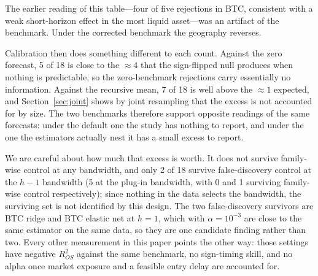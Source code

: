 \documentclass{article}
\theoremstyle{plain}
\theoremstyle{definition}
\newcommand{\rsq}{R^2_{OS}}
\begin{document}
The earlier reading of this table---four of five rejections in BTC, consistent with
a weak short-horizon effect in the most liquid asset---was an artifact of the
benchmark. Under the corrected benchmark the geography reverses.

Calibration then does something different to each count. Against the zero forecast,
5 of 18 is close to the $\approx 4$ that the sign-flipped null produces when nothing is
predictable, so the zero-benchmark rejections carry essentially no information. Against the
recursive mean, 7 of 18 is well above the $\approx 1$ expected, and Section~\ref{sec:joint}
shows by joint resampling that the excess is not accounted for by size. The two benchmarks therefore support opposite readings of
the same forecasts: under the default one the study has nothing to report, and under
the one the estimators actually nest it has a small excess to report.

We are careful about how much that excess is worth. It does not survive family-wise
control at any bandwidth, and only 2 of 18 survive false-discovery control at the
$h-1$ bandwidth (5 at the plug-in bandwidth, with 0 and 1 surviving family-wise
control respectively); since nothing in the data selects the bandwidth, the
surviving set is not identified by this design. The two false-discovery survivors
are BTC ridge and BTC elastic net at $h=1$, which with $\alpha = 10^{-3}$ are close
to the same estimator on the same data, so they are one candidate finding rather
than two. Every other measurement in this paper points the other way: those settings
have negative $\rsq$ against the same benchmark, no sign-timing skill, and no alpha
once market exposure and a feasible entry delay are accounted for.
\end{document}
